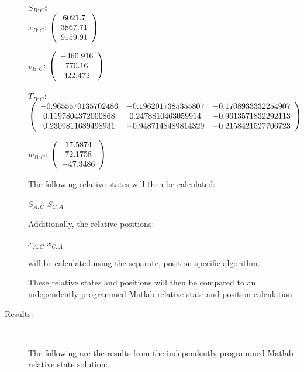 \begin{description}
\Large{\textbf{$S_{B:C}$:}} \normalsize \\

$x_{B:C}$: $\left( \begin{array} {ccc}  6021.7 \\    3867.71 \\    9159.91
\end{array} \right)\\ \\$

$v_{B:C}$:  $\left( \begin{array} {ccc}  -460.916 \\     770.16 \\    322.472
\end{array} \right)\\ \\$

$T_{B:C}$: $\left( \begin{array} {ccc}
 -0.9655570135702486 & -0.1962017385355807 & -0.1708933332254907 \\
  0.1197804372000868 & 0.2478810463059914 & -0.9613571832292113 \\
   0.2309811689498931 & -0.9487148489814329 & -0.2158421527706723
\end{array} \right)\\ \\$

$w_{B:C}$:  $\left( \begin{array} {ccc}  17.5874 \\    72.1758 \\   -47.3486
\end{array} \right)\\ \\$

The following relative states will then be calculated:

$S_{A:C}$
$S_{C:A}$

Additionally, the relative positions:

$x_{A:C}$
$x_{C:A}$

will be calculated using the separate, position specific algorithm.

These relative states and positions will then be compared to an
independently programmed Matlab relative state and position calculation.

\item[Results:] \ \newline

The following are the results from the independently programmed Matlab relative state
solution:


\end{description}

